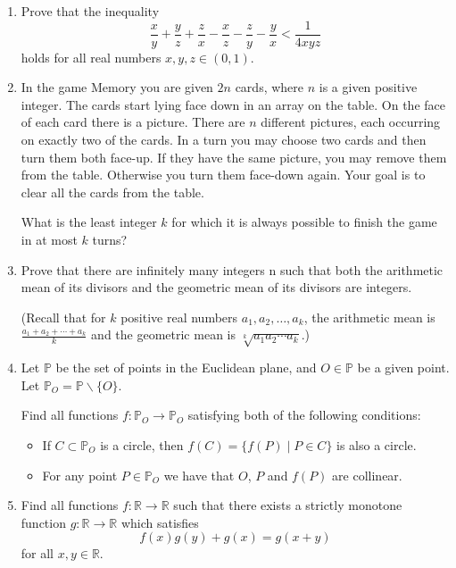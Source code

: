 \documentclass{article}
\begin{document}
\begin{enumerate}[1.]

\vspace{6pt}
\item %
Prove that the inequality
\[ \frac{x}{y} +\frac{y}{z} +\frac{z}{x} -\frac{x}{z} -\frac{z}{y} -\frac{y}{x} < \frac{1}{4xyz} \]
holds for all real numbers $x,y,z \in (0,1)$.


\vspace{6pt}
\item %
In the game Memory you are given $2n$ cards, where $n$ is a given positive integer. The cards start lying face down in an array on the table. On the face of each card there is a picture. There are $n$ different pictures, each occurring on exactly two of the cards. In a turn you may choose two cards and then turn them both face-up. If they have the same picture, you may remove them from the table. Otherwise you turn them face-down again. Your goal is to clear all the cards from the table.

What is the least integer $k$ for which it is always possible to finish the game in at most $k$ turns?


\vspace{6pt}
\item %
Prove that there are infinitely many integers n such that both the arithmetic mean of its divisors and the geometric mean of its divisors are integers.

(Recall that for $k$ positive real numbers $a_1, a_2, \dotsc, a_k$, the arithmetic mean is $\frac{a_1 +a_2 +\dotsb +a_k}{k}$ and the geometric mean is $\sqrt[k]{a_1 a_2 \dotsm a_k}$.)


\vspace{6pt}
\item %
Let $\mathbb{P}$ be the set of points in the Euclidean plane, and $O \in \mathbb{P}$ be a given point. Let $\mathbb{P}_O = \mathbb{P} \backslash \{O\}$.

Find all functions $f : \mathbb{P}_O \to \mathbb{P}_O$ satisfying both of the following conditions:
\begin{itemize}
  \item If $C \subset \mathbb{P}_O$ is a circle, then $f(C) = \{ f(P) \mid P \in C \}$ is also a circle.
  \item For any point $P \in \mathbb{P}_O$ we have that $O$, $P$ and $f(P)$ are collinear.
\end{itemize}


\vspace{6pt}
\item %
Find all functions $f : \mathbb{R} \to \mathbb{R}$ such that there exists a strictly monotone function $g : \mathbb{R} \to \mathbb{R}$ which satisfies
\[ f(x)g(y) + g(x) = g(x+y) \]
for all $x, y \in \mathbb{R}$.



\end{enumerate}
\end{document}
